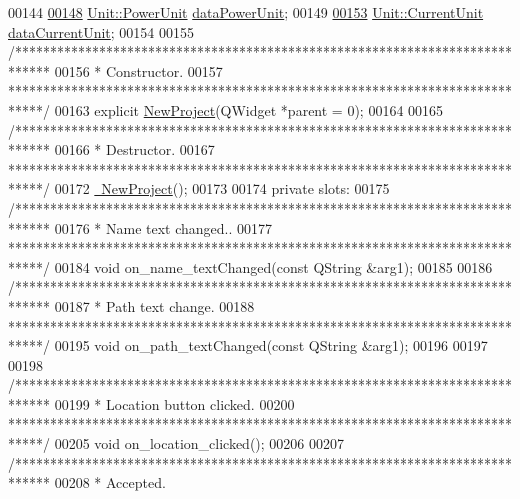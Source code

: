 \begin{DoxyCode}
00144 
\hypertarget{newproject_8h_source_l00148}{}\hyperlink{class_new_project_a500a8b98942c5f4900348fd315fb9d8b}{00148}   \hyperlink{class_unit_ace265ae255370ccacfd5370337572c3b}{Unit::PowerUnit} \hyperlink{class_new_project_a500a8b98942c5f4900348fd315fb9d8b}{dataPowerUnit};
00149 
\hypertarget{newproject_8h_source_l00153}{}\hyperlink{class_new_project_a9d389065ff7f8588338069018088a20f}{00153}   \hyperlink{class_unit_a0794cf6c9682f48296dd4a5315389787}{Unit::CurrentUnit} \hyperlink{class_new_project_a9d389065ff7f8588338069018088a20f}{dataCurrentUnit};
00154 
00155   \textcolor{comment}{/*****************************************************************************}
00156 \textcolor{comment}{  * Constructor.}
00157 \textcolor{comment}{  *****************************************************************************/}
00163   \textcolor{keyword}{explicit} \hyperlink{group___window_ga011ff7a4c380f74bdafa4fdaed510c42}{NewProject}(QWidget *parent = 0);
00164 
00165   \textcolor{comment}{/*****************************************************************************}
00166 \textcolor{comment}{  * Destructor.}
00167 \textcolor{comment}{  *****************************************************************************/}
00172   \hyperlink{group___window_gae65155941598f4272f3df0b2f1428c78}{~NewProject}();
00173 
00174 \textcolor{keyword}{private} slots:
00175   \textcolor{comment}{/*****************************************************************************}
00176 \textcolor{comment}{  * Name text changed..}
00177 \textcolor{comment}{  *****************************************************************************/}
00184   \textcolor{keywordtype}{void} on\_name\_textChanged(\textcolor{keyword}{const} QString &arg1);
00185 
00186   \textcolor{comment}{/*****************************************************************************}
00187 \textcolor{comment}{  * Path text change.}
00188 \textcolor{comment}{  *****************************************************************************/}
00195   \textcolor{keywordtype}{void} on\_path\_textChanged(\textcolor{keyword}{const} QString &arg1);
00196 
00197 
00198   \textcolor{comment}{/*****************************************************************************}
00199 \textcolor{comment}{  * Location button clicked.}
00200 \textcolor{comment}{  *****************************************************************************/}
00205   \textcolor{keywordtype}{void} on\_location\_clicked();
00206 
00207   \textcolor{comment}{/*****************************************************************************}
00208 \textcolor{comment}{  * Accepted.}

\end{DoxyCode}
